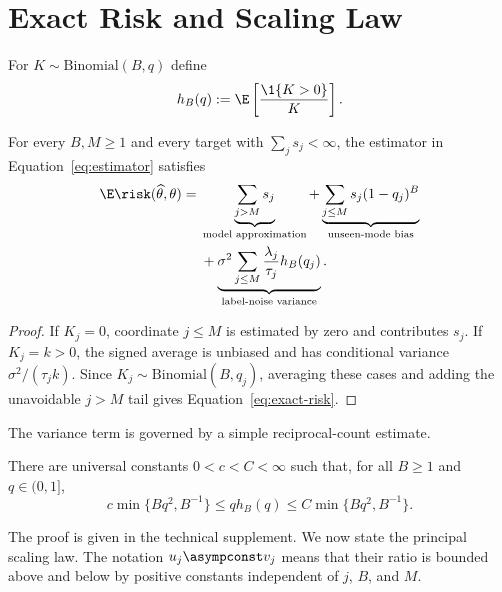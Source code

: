 \section{Exact Risk and Scaling Law}

For $K\sim\mathrm{Binomial}(B,q)$ define
\begin{equation}
h_B(q):=\E\left[\frac{\1\{K>0\}}{K}\right].
\label{eq:h-def}
\end{equation}

\begin{theorem}
\label{thm:exact-risk}
For every $B,M\ge1$ and every target with
$\sum_j s_j<\infty$, the estimator in Equation~\eqref{eq:estimator} satisfies
\begin{align}
\E\risk(\widehat\theta,\theta)
={}&\underbrace{\sum_{j>M}s_j}_{\text{model approximation}}
+\underbrace{\sum_{j\le M}s_j(1-q_j)^B}_{\text{unseen-mode bias}}
\nonumber\\
&+\underbrace{\sigma^2\sum_{j\le M}
\frac{\lambda_j}{\tau_j}h_B(q_j)}_{\text{label-noise variance}}.
\label{eq:exact-risk}
\end{align}
\end{theorem}

\begin{proof}
If $K_j=0$, coordinate $j\le M$ is estimated by zero and contributes
$s_j$. If $K_j=k>0$, the signed average is unbiased and has conditional
variance $\sigma^2/(\tau_jk)$. Since $K_j\sim\mathrm{Binomial}(B,q_j)$,
averaging these cases and adding the unavoidable $j>M$ tail gives
Equation~\eqref{eq:exact-risk}.
\end{proof}

The variance term is governed by a simple reciprocal-count estimate.

\begin{lemma}
\label{lem:binomial}
There are universal constants $0<c<C<\infty$ such that, for all $B\ge1$ and
$q\in(0,1]$,
\begin{equation}
c\min\{Bq^2,B^{-1}\}
\le qh_B(q)
\le C\min\{Bq^2,B^{-1}\}.
\label{eq:binomial-bound}
\end{equation}
\end{lemma}

The proof is given in the technical supplement. We now state the principal scaling
law. The notation $u_j\asympconst v_j$ means that their ratio is bounded above
and below by positive constants independent of $j$, $B$, and $M$.

